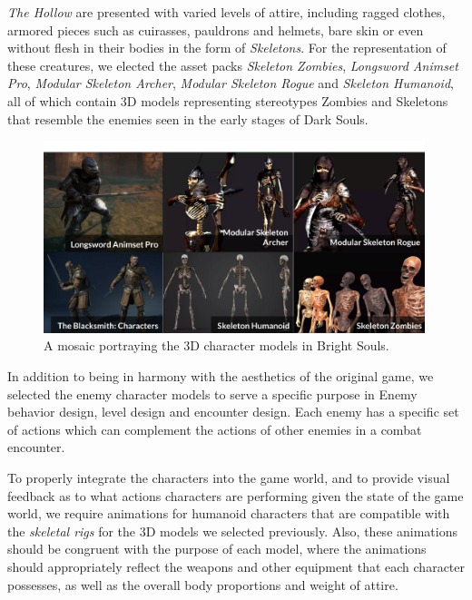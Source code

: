 \documentclass[cic,tc,english]{iiufrgs}
\begin{document}
\emph{The Hollow} are presented with varied levels of attire, including ragged clothes, armored pieces such as cuirasses, pauldrons and helmets, bare skin or even without flesh in their bodies in the form of \emph{Skeletons}. For the representation of these creatures, we elected the asset packs \emph{Skeleton Zombies}, \emph{Longsword Animset Pro}, \emph{Modular Skeleton Archer}, \emph{Modular Skeleton Rogue} and \emph{Skeleton Humanoid}, all of which contain 3D models representing stereotypes Zombies and Skeletons that resemble the enemies seen in the early stages of Dark Souls.

\begin{figure}
    \caption{A mosaic portraying the 3D character models in Bright Souls.}
    \begin{center}
        \includegraphics[width=30em]{figures/fig-character-assets.png}
    \end{center}
    \label{fig:character-assets}
\end{figure}

In addition to being in harmony with the aesthetics of the original game, we selected the enemy character models to serve a specific purpose in Enemy behavior design, level design and encounter design. Each enemy has a specific set of actions which can complement the actions of other enemies in a combat encounter. 



To properly integrate the characters into the game world, and to provide visual feedback as to what actions characters are performing given the state of the game world, we require animations for humanoid characters that are compatible with the \emph{skeletal rigs} for the 3D models we selected previously. Also, these animations should be congruent with the purpose of each model, where the animations should appropriately reflect the weapons and other equipment that each character possesses, as well as the overall body proportions and weight of attire.
\end{document}
